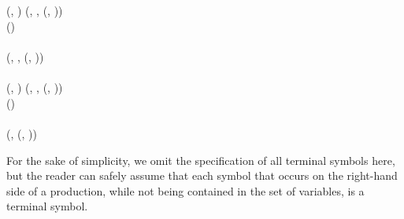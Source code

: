 \begin{table}
\begin{bnf*}
{		} \\
		 \\
		 {
			(, \bnfsp {}) \bnfor {}(, \bnfsp {}, \bnfsp {}(, \bnfsp {}))
		} \\
		 {
			() \bnfsp {} \bnfsp {}
		} \\ \\
		 {
			(\bnfts{$\omega$}, \bnfsp {}, \bnfsp {}(, \bnfsp {})) \bnfor
		} \\
		 \\
		 {
			(, \bnfsp {}) \bnfor {}(, \bnfsp {}, \bnfsp {}(, \bnfsp {}))
		} \\ 
		 {
			() \bnfsp {} \bnfsp {}
		} \\ \\
		 {
			(, \bnfsp {}(, \bnfsp {}))
		} \\
		 {
			 \bnfor \bnfes
		}
	\end{bnf*}
\end{table}
For the sake of simplicity, we omit the specification of all terminal symbols here, but the reader can safely assume that each symbol that occurs on the right-hand side of a production, while not being contained in the set of variables, is a terminal symbol.
